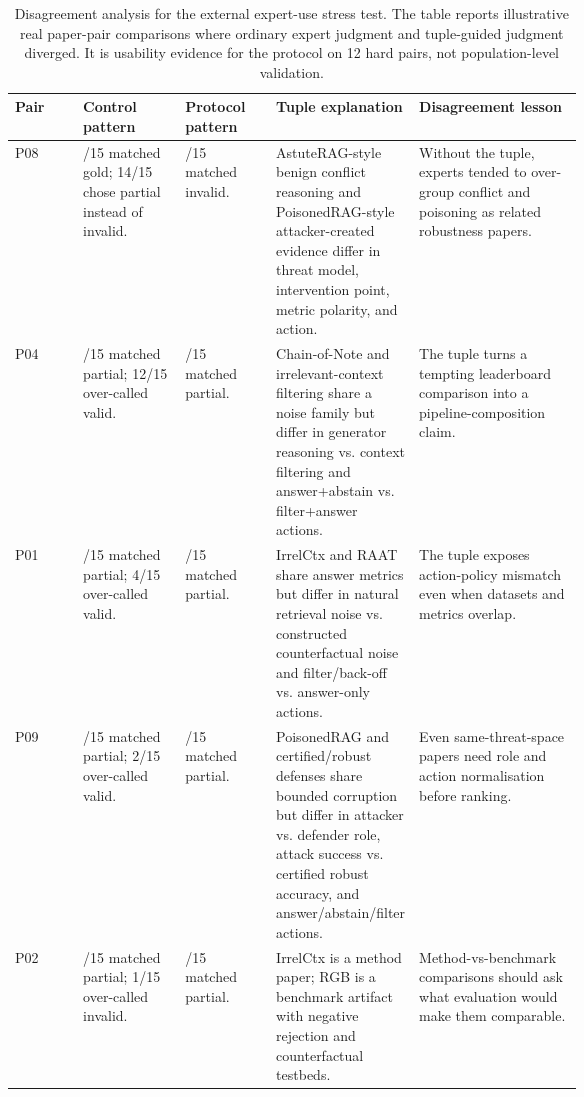 \begin{table}[t]
\centering
\scriptsize
\renewcommand{\arraystretch}{0.88}
\begin{tabularx}{\linewidth}{>{\raggedright\arraybackslash}p{0.12\linewidth}>{\raggedright\arraybackslash}p{0.18\linewidth}>{\raggedright\arraybackslash}p{0.16\linewidth}>{\raggedright\arraybackslash}p{0.20\linewidth}X}
\toprule
\textbf{Pair} & \textbf{Control pattern} & \textbf{Protocol pattern} & \textbf{Tuple explanation} & \textbf{Disagreement lesson} \\
\midrule
P08 & 1/15 matched gold; 14/15 chose partial instead of invalid. & 13/15 matched invalid. & AstuteRAG-style benign conflict reasoning and PoisonedRAG-style attacker-created evidence differ in threat model, intervention point, metric polarity, and action. & Without the tuple, experts tended to over-group conflict and poisoning as related robustness papers. \\
P04 & 3/15 matched partial; 12/15 over-called valid. & 15/15 matched partial. & Chain-of-Note and irrelevant-context filtering share a noise family but differ in generator reasoning vs. context filtering and answer+abstain vs. filter+answer actions. & The tuple turns a tempting leaderboard comparison into a pipeline-composition claim. \\
P01 & 11/15 matched partial; 4/15 over-called valid. & 15/15 matched partial. & IrrelCtx and RAAT share answer metrics but differ in natural retrieval noise vs. constructed counterfactual noise and filter/back-off vs. answer-only actions. & The tuple exposes action-policy mismatch even when datasets and metrics overlap. \\
P09 & 13/15 matched partial; 2/15 over-called valid. & 15/15 matched partial. & PoisonedRAG and certified/robust defenses share bounded corruption but differ in attacker vs. defender role, attack success vs. certified robust accuracy, and answer/abstain/filter actions. & Even same-threat-space papers need role and action normalisation before ranking. \\
P02 & 14/15 matched partial; 1/15 over-called invalid. & 15/15 matched partial. & IrrelCtx is a method paper; RGB is a benchmark artifact with negative rejection and counterfactual testbeds. & Method-vs-benchmark comparisons should ask what evaluation would make them comparable. \\
\bottomrule
\end{tabularx}
\caption{Disagreement analysis for the external expert-use stress test. The table reports illustrative real paper-pair comparisons where ordinary expert judgment and tuple-guided judgment diverged. It is usability evidence for the protocol on 12 hard pairs, not population-level validation.}
\label{tab:expert-disagreement-analysis}
\end{table}

